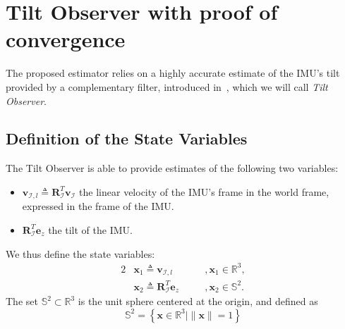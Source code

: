 \documentclass{IJCAS}
\begin{document}


\section{Tilt Observer with proof of convergence}
\label{sec:tilt_observer}
The proposed estimator relies on a highly accurate estimate of the IMU's tilt provided by a complementary filter, introduced in~\cite{benallegue2020LyapunovStableOrientationEstimatorHumanoids}, which we will call \emph{Tilt Observer}. 

\subsection{Definition of the State Variables}
The Tilt Observer is able to provide estimates of the following two variables: 
\begin{itemize}
    \item $\boldsymbol{v}_{\mathcal{I}, l} \triangleq \boldsymbol{R}^{T}_{\mathcal{I}} \boldsymbol{v}_{\mathcal{I}} $ the linear velocity of the IMU's frame in the world frame, expressed in the frame of the IMU.
    \item $\boldsymbol{R}^{T}_{\mathcal{I}} \boldsymbol{e}_z$ the tilt of the IMU.
\end{itemize}
We thus define the state variables: 
\begin{alignat}{2}
&\boldsymbol{x}_{1} \triangleq \boldsymbol{v}_{\mathcal{I}, l} \quad &&, \boldsymbol{x}_{1} \in \mathbb{R}^{3}, \label{eq:x1} \\
&\boldsymbol{x}_{2} \triangleq \boldsymbol{R}^{T}_{\mathcal{I}} \boldsymbol{e}_z \quad &&, \boldsymbol{x}_{2} \in \mathbb{S}^{2}. \label{eq:x2}
\end{alignat} 
The set $\mathbb{S}^{2} \subset \mathbb{R}^{3}$ is the unit sphere centered at the origin, and defined as
\begin{equation}
    \mathbb{S}^{2} = \left\{ \boldsymbol{x} \in \mathbb{R}^{3} \vert \lVert \boldsymbol{x} \rVert=1 \right\}
\end{equation}
\end{document}
